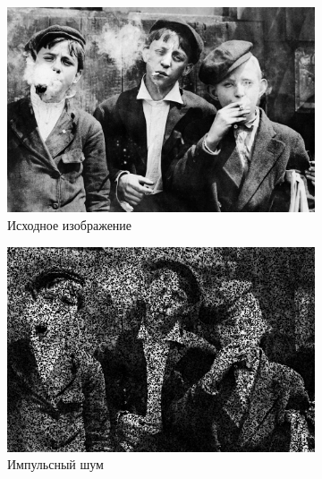   \begin{figure}[ht!] 
    \centering
    \begin{subfigure}[b]{0.5\linewidth}
        \centering
        \includegraphics[width=0.95\linewidth]{../lewis-hine-taschen-main-3.jpg} 
        \caption{Исходное изображение} 
        \label{contraharmonic_-0.5:a} 
        \vspace{4ex}
    \end{subfigure}%
    \begin{subfigure}[b]{0.5\linewidth}
      \centering
      \includegraphics[width=0.95\linewidth]{../Contraharmonic_Filter/Contraharmonic_Impulse_noise_(m,n=(3,_3),q=-0.5).jpg} 
      \caption{Импульсный шум} 
      \label{contraharmonic_-0.5:b} 
      \vspace{4ex}
    \end{subfigure}
    \begin{subfigure}[b]{0.5\linewidth}
      \centering

\end{subfigure}
\end{figure}
